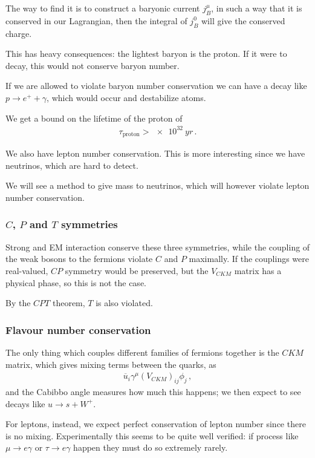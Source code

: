 \documentclass[main.tex]{subfiles}
\begin{document}
The way to find it is to construct a baryonic current \(j^{\mu }_{B}\), in such a way that it is conserved in our Lagrangian, then the integral of \(j^{0}_{B}\) will give the conserved charge.

This has heavy consequences: the lightest baryon is the proton. If it were to decay, this would not conserve baryon number. 

If we are allowed to violate baryon number conservation we can have a decay like \(p \to e^{+ } + \gamma \), which would occur and destabilize atoms.

We get a bound on the lifetime of the proton of 
%
\begin{align}
\tau _{\text{proton}} > \SI{e32}{yr}
\,.
\end{align}

We also have lepton number conservation.
This is more interesting since we have neutrinos, which are hard to detect.

We will see a method to give mass to neutrinos, which will however violate lepton number conservation.

\subsubsection{\(C\), \(P\) and \(T\) symmetries}

Strong and EM interaction conserve these three symmetries, while the coupling of the weak bosons to the fermions violate \(C\) and \(P\) maximally.
If the couplings were real-valued, \(CP\) symmetry would be preserved, but the \(V_{CKM}\) matrix has a physical phase, so this is not the case. 

By the \(CPT\) theorem, \(T\) is also violated.

\subsubsection{Flavour number conservation}

The only thing which couples different families of fermions together is the \(CKM\) matrix, which gives mixing terms between the quarks, as 
%
\begin{align}
\overline{u}_{i} \gamma^{\mu } (V_{CKM})_{ij} \phi_{j}
\,,
\end{align}
%
and the Cabibbo angle measures how much this happens; we then expect to see decays like \(u \to s + W^{+}\). 

For leptons, instead, we expect perfect conservation of lepton number since there is no mixing. Experimentally this seems to be quite well verified: if process like \(\mu \to e \gamma \) or \(\tau \to e \gamma \) happen they must do so extremely rarely. 
\end{document}
